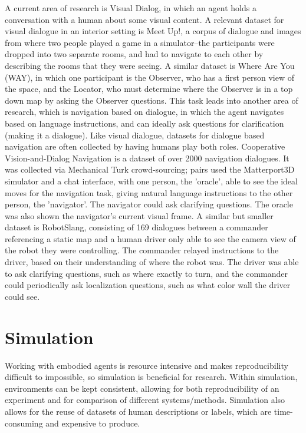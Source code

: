 A current area of research is Visual Dialog, in which an agent holds a conversation with a human about some visual content\cite{das2017}. A relevant dataset for visual dialogue in an interior setting is Meet Up!, a corpus of dialogue and images from where two people played a game in a simulator--the participants were dropped into two separate rooms, and had to navigate to each other by describing the rooms that they were seeing\cite{meetup}. A similar dataset is Where Are You (WAY), in which one participant is the Observer, who has a first person view of the space, and the Locator, who must determine where the Observer is in a top down map by asking the Observer questions\cite{whereareyou}. This task leads into another area of research, which is navigation based on dialogue, in which the agent navigates based on language instructions, and can ideally ask questions for clarification (making it a dialogue). Like visual dialogue, datasets for dialogue based navigation are often collected by having humans play both roles. Cooperative Vision-and-Dialog Navigation is a dataset of over 2000 navigation dialogues\cite{thomason2019visionanddialog}. It was collected via Mechanical Turk crowd-sourcing; pairs used the Matterport3D simulator and a chat interface, with one person, the ’oracle’, able to see the ideal moves for the navigation task, giving natural language instructions to the other person, the ’navigator'. The navigator could ask clarifying questions. The oracle was also shown the navigator's current visual frame. \newline
A similar but smaller dataset is RobotSlang, consisting of 169 dialogues between a commander referencing a static map and a human driver only able to see the camera view of the robot they were controlling\cite{robotslang}. The commander relayed instructions to the driver, based on their understanding of where the robot was. The driver was able to ask clarifying questions, such as where exactly to turn, and the commander could periodically ask localization questions, such as what color wall the driver could see. \newline
\section{Simulation}
Working with embodied agents is resource intensive and makes reproducibility difficult to impossible, so simulation is beneficial for research. Within simulation, environments can be kept consistent, allowing for both reproducibility of an experiment and for comparison of different systems/methods. Simulation also allows for the reuse of datasets of human descriptions or labels, which are time-consuming and expensive to produce.

